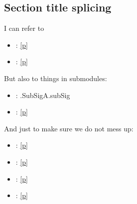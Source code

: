{\subsection{Section title splicing\label{section-title-splicing}}%
I can refer to

\begin{itemize}\item{ : \hyperref[module-Ocamlary-indexmodules]{[p\pageref*{module-Ocamlary-indexmodules}]}}%
\item{ : \hyperref[module-Ocamlary-aliases]{[p\pageref*{module-Ocamlary-aliases}]}}\end{itemize}%
But also to things in submodules:

\begin{itemize}\item{ : .SubSigA.subSig}%
\item{ : \hyperref[module-Ocamlary-module-Aliases-incl]{[p\pageref*{module-Ocamlary-module-Aliases-incl}]}}\end{itemize}%
And just to make sure we do not mess up:

\begin{itemize}\item{ : \hyperref[module-Ocamlary-indexmodules]{[p\pageref*{module-Ocamlary-indexmodules}]}}%
\item{ : \hyperref[module-Ocamlary-aliases]{[p\pageref*{module-Ocamlary-aliases}]}}%
\item{ : \hyperref[xref-unresolved]{[p\pageref*{xref-unresolved}]}}%
\item{ : \hyperref[module-Ocamlary-module-Aliases-incl]{[p\pageref*{module-Ocamlary-module-Aliases-incl}]}}\end{itemize}%
}
